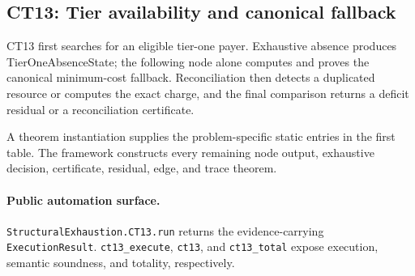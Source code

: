 \subsection{CT13: Tier availability and canonical fallback}
\label{sec:ct13-automation}

CT13 first searches for an eligible tier-one payer. Exhaustive absence produces TierOneAbsenceState; the following node alone computes and proves the canonical minimum-cost fallback. Reconciliation then detects a duplicated resource or computes the exact charge, and the final comparison returns a deficit residual or a reconciliation certificate.

A theorem instantiation supplies the problem-specific static entries in the first table. The framework constructs every remaining node output, exhaustive decision, certificate, residual, edge, and trace theorem.

\paragraph{Public automation surface.}
\texttt{StructuralExhaustion.CT13.run} returns the evidence-carrying \texttt{ExecutionResult}. \texttt{ct13\_\allowbreak{}execute}, \texttt{ct13}, and \texttt{ct13\_\allowbreak{}total} expose execution, semantic soundness, and totality, respectively.

